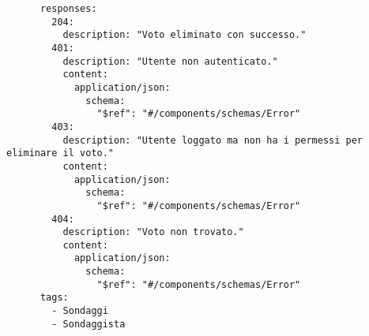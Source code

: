 \begin{verbatim}
      responses:
        204:
          description: "Voto eliminato con successo."
        401:
          description: "Utente non autenticato."
          content:
            application/json:
              schema:
                "$ref": "#/components/schemas/Error"
        403:
          description: "Utente loggato ma non ha i permessi per eliminare il voto."
          content:
            application/json:
              schema:
                "$ref": "#/components/schemas/Error"
        404:
          description: "Voto non trovato."
          content:
            application/json:
              schema:
                "$ref": "#/components/schemas/Error"
      tags:
        - Sondaggi
        - Sondaggista
\end{verbatim}
